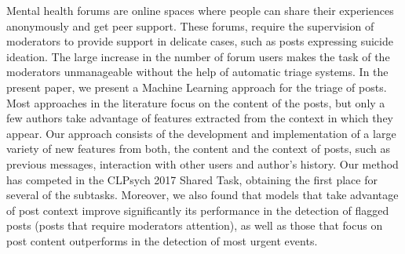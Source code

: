 Mental health forums are online spaces where people can share their experiences anonymously and get peer support. These forums, require the supervision of moderators to provide support in delicate cases, such as posts expressing suicide ideation. The large increase in the number of forum users makes the task of the moderators unmanageable without the help of automatic triage systems. In the present paper, we present a Machine Learning approach for the triage of posts. Most approaches in the literature focus on the content of the posts, but only a few authors take advantage of features extracted from the context in which they appear. Our approach consists of the development and implementation of a large variety of new features from both, the content and the context of posts, such as previous messages, interaction with other users and author's history. Our method has competed in the CLPsych 2017 Shared Task, obtaining the first place for several of the subtasks. Moreover, we also found that models that take advantage of post context improve significantly its performance in the detection of flagged posts (posts that require moderators attention), as well as those that focus on post content outperforms in the detection of most urgent events.

